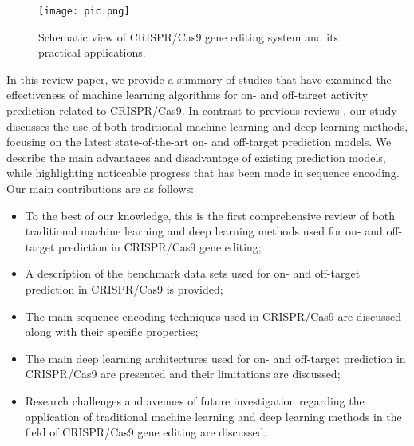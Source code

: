 \documentclass[unnumsec,webpdf,contemporary,large]{oup-authoring-template}
\theoremstyle{thmstyleone}%
\theoremstyle{thmstyletwo}%
\theoremstyle{thmstylethree}%
\begin{document}
\begin{figure*}
\centering
\texttt{[image: pic.png]}
\caption{Schematic view of CRISPR/Cas9 gene editing system and its practical applications.}
\label{fig:GE}
\end{figure*}

In this review paper, we provide a summary of studies that have examined the effectiveness of machine learning algorithms for on- and off-target activity prediction related to CRISPR/Cas9. In contrast to previous reviews \cite{naeem2020latest, almutiri2022survey, wilson2018current, wang2020overview, newman2020cas9}, our study discusses the use of both traditional machine learning and deep learning methods, focusing on the latest state-of-the-art on- and off-target prediction models. We describe the main advantages and disadvantage of existing prediction models, while highlighting noticeable progress that has been made in sequence encoding. 
\\
Our main contributions are as follows:
\begin{itemize}
\item To the best of our knowledge, this is the first comprehensive review of both traditional machine learning and deep learning methods used for on- and off-target prediction in CRISPR/Cas9 gene editing;
\item A description of the benchmark data sets used for on- and off-target prediction in CRISPR/Cas9 is provided;
\item The main sequence encoding techniques used in CRISPR/Cas9 are discussed along with their specific properties;
\item The main deep learning architectures used for on- and off-target prediction in CRISPR/Cas9 are presented and their limitations are discussed;
\item Research challenges and avenues of future investigation regarding the application of traditional machine learning and deep learning methods in the field of CRISPR/Cas9 gene editing are discussed.
\end{itemize}
\end{document}
